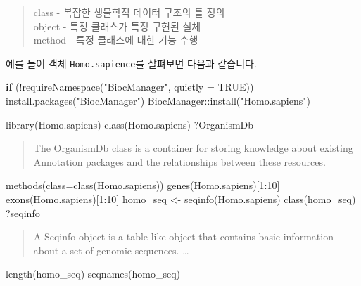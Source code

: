 \documentclass[
]{book}
\newenvironment{Shaded}{\begin{snugshade}}{\end{snugshade}}
\newcommand{\AttributeTok}[1]{\textcolor[rgb]{0.77,0.63,0.00}{#1}}
\newcommand{\ConstantTok}[1]{\textcolor[rgb]{0.00,0.00,0.00}{#1}}
\newcommand{\ControlFlowTok}[1]{\textcolor[rgb]{0.13,0.29,0.53}{\textbf{#1}}}
\newcommand{\DecValTok}[1]{\textcolor[rgb]{0.00,0.00,0.81}{#1}}
\newcommand{\FunctionTok}[1]{\textcolor[rgb]{0.00,0.00,0.00}{#1}}
\newcommand{\NormalTok}[1]{#1}
\newcommand{\OtherTok}[1]{\textcolor[rgb]{0.56,0.35,0.01}{#1}}
\newcommand{\SpecialCharTok}[1]{\textcolor[rgb]{0.00,0.00,0.00}{#1}}
\newcommand{\StringTok}[1]{\textcolor[rgb]{0.31,0.60,0.02}{#1}}
\begin{document}
\begin{quote}
class - 복잡한 생물학적 데이터 구조의 틀 정의\\
object - 특정 클래스가 특정 구현된 실체\\
method - 특정 클래스에 대한 기능 수행
\end{quote}

예를 들어 객체 \texttt{Homo.sapience}를 살펴보면 다음과 같습니다.

\begin{Shaded}
\begin{Highlighting}[]
\ControlFlowTok{if}\NormalTok{ (}\SpecialCharTok{!}\FunctionTok{requireNamespace}\NormalTok{(}\StringTok{"BiocManager"}\NormalTok{, }\AttributeTok{quietly =} \ConstantTok{TRUE}\NormalTok{))}
    \FunctionTok{install.packages}\NormalTok{(}\StringTok{"BiocManager"}\NormalTok{)}
\NormalTok{BiocManager}\SpecialCharTok{::}\FunctionTok{install}\NormalTok{(}\StringTok{"Homo.sapiens"}\NormalTok{)}

\FunctionTok{library}\NormalTok{(Homo.sapiens)}
\FunctionTok{class}\NormalTok{(Homo.sapiens)}
\NormalTok{?OrganismDb}
\end{Highlighting}
\end{Shaded}

\begin{quote}
The OrganismDb class is a container for storing knowledge about existing Annotation packages and the relationships between these resources.
\end{quote}

\begin{Shaded}
\begin{Highlighting}[]
\FunctionTok{methods}\NormalTok{(}\AttributeTok{class=}\FunctionTok{class}\NormalTok{(Homo.sapiens))}
\FunctionTok{genes}\NormalTok{(Homo.sapiens)[}\DecValTok{1}\SpecialCharTok{:}\DecValTok{10}\NormalTok{]}
\FunctionTok{exons}\NormalTok{(Homo.sapiens)[}\DecValTok{1}\SpecialCharTok{:}\DecValTok{10}\NormalTok{]}
\NormalTok{homo\_seq }\OtherTok{\textless{}{-}} \FunctionTok{seqinfo}\NormalTok{(Homo.sapiens)}
\FunctionTok{class}\NormalTok{(homo\_seq)}
\NormalTok{?seqinfo}
\end{Highlighting}
\end{Shaded}

\begin{quote}
A Seqinfo object is a table-like object that contains basic information about a set of genomic sequences. \ldots{}
\end{quote}

\begin{Shaded}
\begin{Highlighting}[]
\FunctionTok{length}\NormalTok{(homo\_seq)}
\FunctionTok{seqnames}\NormalTok{(homo\_seq)}
\end{Highlighting}
\end{Shaded}
\end{document}
